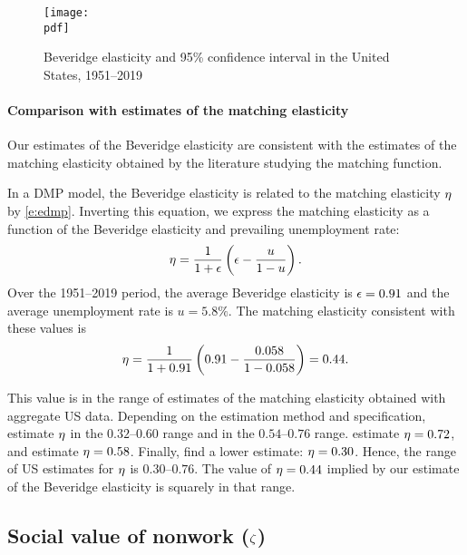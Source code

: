 \documentclass[letterpaper,12pt,leqno]{article}
\def\pdf{../../figures/xhosios_202103.pdf}
\begin{document}
\begin{figure}[t]
\texttt{[image: \\pdf]}
\caption{Beveridge elasticity and 95\% confidence interval in the United States, 1951--2019}
\label{f:epsilon}\end{figure}

\paragraph{Comparison with estimates of the matching elasticity} Our estimates of the Beveridge elasticity are consistent with the estimates of the matching elasticity obtained by the literature studying the matching function. 

In a DMP model, the Beveridge elasticity is related to the matching elasticity $\eta$ by \eqref{e:edmp}. Inverting this equation, we express the matching elasticity as a function of the Beveridge elasticity and prevailing unemployment rate:
\begin{equation}
\eta = \frac{1}{1+\epsilon}\left( \epsilon-\frac{u}{1-u} \right).
\label{e:eta}\end{equation}
Over the 1951--2019 period, the average Beveridge elasticity is $\epsilon=0.91$ and the average unemployment rate is $u=5.8\%$. The matching elasticity consistent with these values is 
\begin{equation*}
\eta = \frac{1}{1+0.91}\left( 0.91-\frac{0.058}{1-0.058} \right) = 0.44.
\end{equation*}

This value is in the range of estimates of the matching elasticity obtained with aggregate US data. Depending on the estimation method and specification,  estimate $\eta$ in the $0.32$--$0.60$ range and  in the $0.54$--$0.76$ range.  estimate $\eta=0.72$, and  estimate $\eta=0.58$. Finally,  find a lower estimate: $\eta=0.30$. Hence, the range of US estimates for $\eta$ is $0.30$--$0.76$. The value of $\eta=0.44$ implied by our estimate of the Beveridge elasticity is squarely in that range.

\subsection{Social value of nonwork ($\zeta$)}
\end{document}
